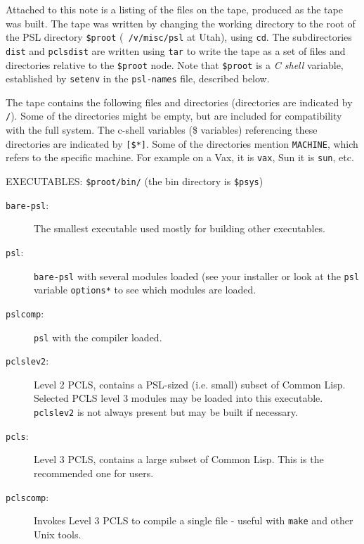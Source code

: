 Attached to this note is a listing of the files on the tape, produced
as the tape was built. The tape was written by changing the working
directory to the root of the PSL directory {\tt \$proot} ({\tt
/v/misc/psl} at Utah), using {\tt cd}.  The subdirectories {\tt dist}
and {\tt pclsdist} are written using {\tt tar} to write the tape as a
set of files and directories relative to the {\tt \$proot} node.  Note
that {\tt \$proot} is a {\em C shell} variable, established by {\tt setenv}
in the {\tt psl-names} file, described below.

The tape contains the following files and directories
(directories are indicated by {\tt */}). Some of the directories
might be empty, but are included for compatibility with the full
system. The c-shell variables (\$ variables) referencing these
directories are indicated by {\tt [\$*]}.  Some of the directories
mention {\tt MACHINE}, which refers to the specific machine.  For
example on a Vax, it is {\tt vax}, Sun it is {\tt sun}, etc.

\vskip 12pt
\noindent
EXECUTABLES: {\tt \$proot/bin/} (the bin directory is {\tt \$psys})

\begin{description}

\item[{\tt bare-psl}:] The smallest executable used mostly for
building other executables. 

\item[{\tt psl}:] {\tt bare-psl} with several modules loaded (see your
installer or look at the {\tt psl} variable {\tt options*} to see which
modules are loaded.

\item[{\tt pslcomp}:] {\tt psl} with the compiler loaded.

\item[{\tt pclslev2}:]
Level 2 PCLS, contains a PSL-sized (i.e. small) subset of Common Lisp.
Selected PCLS level 3 modules may be loaded into this executable.
{\tt pclslev2} is not always present but may be built if necessary.

\item[{\tt pcls}:]
Level 3 PCLS, contains a large subset of Common Lisp.  This is the
recommended one for users.

\item[{\tt pclscomp}:]
Invokes Level 3 PCLS to compile a single file - useful with
{\tt make} and other Unix tools.

\end{description}

